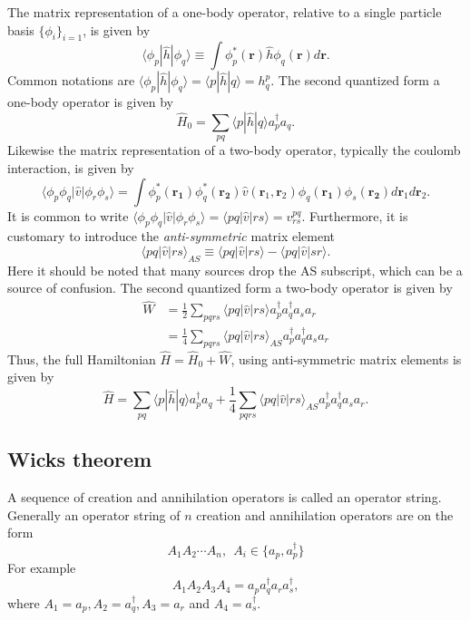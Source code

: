 \documentclass[a4paper,10pt]{report}
\newcommand{\braket}[1]{\langle#1\rangle}
\begin{document}
The matrix representation of a one-body operator, relative to a single particle basis $\{ \phi_i \}_{i=1}$, is given by 
\begin{equation}
 \braket{\phi_p|\hat{h}|\phi_q} \equiv \int \phi^*_p(\mathbf{r}) \hat{h} \phi_q(\mathbf{r}) d\mathbf{r}.
\end{equation}
Common notations are $\braket{\phi_p|\hat{h}|\phi_q}=\braket{p|\hat{h}|q}=h^p_q$. The second quantized form a one-body operator 
is given by
\begin{equation}
 \hat{H}_0 = \sum_{pq}\braket{p|\hat{h}|q} a_p^\dagger a_q.
\end{equation}
Likewise the matrix representation of a two-body operator, typically the coulomb interaction, is given by 
\begin{equation}
 \braket{\phi_p \phi_q|\hat{v}|\phi_r \phi_s} = \int \phi^*_p(\mathbf{r_1}) \phi^*_q(\mathbf{r_2}) \hat{v}(\mathbf{r}_1,\mathbf{r}_2) \phi_q(\mathbf{r_1}) \phi_s(\mathbf{r_2}) d \mathbf{r}_1 d \mathbf{r}_2.
\end{equation}
It is common to write $\braket{\phi_p \phi_q|\hat{v}|\phi_r \phi_s} = \braket{pq|\hat{v}|rs} = v^{pq}_{rs}$. Furthermore, it is customary 
to introduce the \textit{anti-symmetric} matrix element
\begin{equation}
 \braket{pq|\hat{v}|rs}_{AS} \equiv \braket{pq|\hat{v}|rs} - \braket{pq|\hat{v}|sr}.
\end{equation}
Here it should be noted that many sources drop the AS subscript, which can be a source of confusion. The second quantized form a 
two-body operator is given by
\begin{align}
 \hat{W} &= \frac{1}{2} \sum_{pqrs} \braket{pq|\hat{v}|rs} a_p^\dagger a_q^\dagger a_s a_r \\
 &= \frac{1}{4}\sum_{pqrs} \braket{pq|\hat{v}|rs}_{AS} a_p^\dagger a_q^\dagger a_s a_r 
\end{align}
Thus, the full Hamiltonian $\hat{H} = \hat{H}_0 + \hat{W}$, using anti-symmetric matrix elements is given by 
\begin{equation}
 \hat{H} =  \sum_{pq}\braket{p|\hat{h}|q} a_p^\dagger a_q + \frac{1}{4}\sum_{pqrs} \braket{pq|\hat{v}|rs}_{AS} a_p^\dagger a_q^\dagger a_s a_r.
\end{equation}

\subsection*{Wicks theorem}
A sequence of creation and annihilation operators is called an operator string. Generally an operator 
string of $n$ creation and annihilation operators are on the form 
\begin{equation}
 A_1 A_2 \cdots A_n, \ \ A_i \in \{a_p,a_p^\dagger\}
\end{equation}
For example
$$A_1A_2A_3A_4 = a_p a_q^\dagger a_r a_s^\dagger,$$
where $A_1 = a_p, A_2 = a_q^\dagger, A_3 = a_r$ and $A_4 = a_s^\dagger$.
\end{document}

